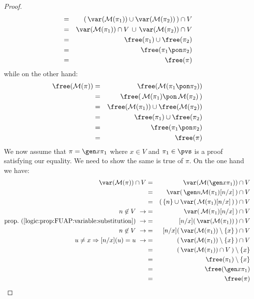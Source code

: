 \begin{proof}
\begin{eqnarray*}
    &=&(\,\var({\cal M}(\pi_{1}))\cup\var({\cal M}(\pi_{2}))\,)\cap V\\
    &=&\var({\cal M}(\pi_{1}))\cap V\,\cup\,\var({\cal M}(\pi_{2}))\cap V\\
    &=&\free(\pi_{1})\cup\free(\pi_{2})\\
    &=&\free(\pi_{1}\pon\pi_{2})\\
    &=&\free(\pi)\\
    \end{eqnarray*}
while on the other hand:
    \begin{eqnarray*}
    \free({\cal M}(\pi))&=&\free({\cal M}(\pi_{1}\pon\pi_{2}))\\
    &=&\free(\,{\cal M}(\pi_{1})\pon\,{\cal M}(\pi_{2})\,)\\
    &=&\free({\cal M}(\pi_{1}))\cup\free({\cal M}(\pi_{2}))\\
    &=&\free(\pi_{1})\cup\free(\pi_{2})\\
    &=&\free(\pi_{1}\pon\pi_{2})\\
    &=&\free(\pi)\\
    \end{eqnarray*}
We now assume that $\pi=\gen x\pi_{1}$ where $x\in V$ and
$\pi_{1}\in\pvs$ is a proof satisfying our equality. We need to show
the same is true of $\pi$. On the one hand we have:
    \begin{eqnarray*}
    \var({\cal M}(\pi))\cap V&=&\var({\cal M}(\gen x\pi_{1}))\cap V\\
    &=&\var(\,\gen n{\cal M}(\pi_{1})[n/x]\,)\cap V\\
    &=&(\,\{n\}\cup\var(\,{\cal M}(\pi_{1})[n/x]\,)\,)\cap V\\
    n\not\in V\ \rightarrow
    &=&\var(\,{\cal M}(\pi_{1})[n/x]\,)\cap V\\
    \mbox{prop.~(\ref{logic:prop:FUAP:variable:substitution})}\ \rightarrow
    &=&[n/x](\,\var({\cal M}(\pi_{1}))\,)\cap V\\
    n\not\in V\ \rightarrow
    &=&[n/x](\,\var({\cal M}(\pi_{1}))\setminus\{x\}\,)\cap V\\
    u\neq x\Rightarrow[n/x](u)=u\ \rightarrow
    &=&(\,\var({\cal M}(\pi_{1}))\setminus\{x\}\,)\cap V\\
    &=&(\,\var({\cal M}(\pi_{1}))\cap V\,)\setminus\{x\}\\
    &=&\free(\pi_{1})\setminus\{x\}\\
    &=&\free(\gen x\pi_{1})\\
    &=&\free(\pi)
    \end{eqnarray*}

\end{proof}
